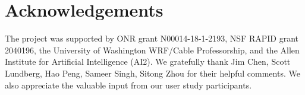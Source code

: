 \section*{Acknowledgements}
The project was supported by ONR grant N00014-18-1-2193, NSF RAPID grant 2040196, the University of Washington WRF/Cable Professorship, and the Allen Institute for Artificial Intelligence (AI2).
We gratefully thank Jim Chen, Scott Lundberg, Hao Peng, Sameer Singh, Sitong Zhou for their helpful comments.
We also appreciate the valuable input from our user study participants.
